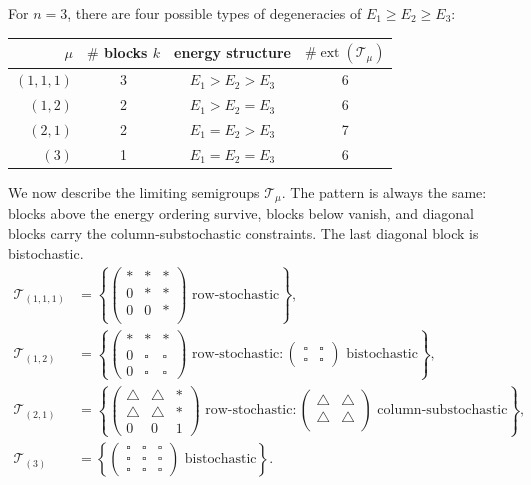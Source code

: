 \documentclass[11pt,a4paper,longbibliography]{amsart}
\numberwithin{equation}{section}
\theoremstyle{plain}
\newtheorem{ex}{Example}[section]
\theoremstyle{definition}
\theoremstyle{remark}
\begin{document}
	For $n=3$, there are four possible types of degeneracies of 
	$E_1 \ge E_2 \ge E_3 $:
	\begin{table}[h]
		\centering
		\begin{tabular}{r|c|c|c}
			$\mu$ &  $\#$ blocks $k$ & energy structure & $\#\operatorname{ext}(\mathcal{T}_{\mu})$ \\
			\hline
			$(1,1,1)$ & 3 & $E_1>E_2>E_3$ & 6\\
			$(1,2)$ & 2 & $E_1>E_2=E_3$& 6\\
			$(2,1)$ & 2 & $E_1=E_2>E_3$& 7\\
			$(3)$ & 1 & $E_1=E_2=E_3$ & 6 
		\end{tabular}
	\end{table}
	
	
	We now describe the limiting semigroups $\mathcal T_\mu$.
	The pattern is always the same: blocks above the energy ordering survive, blocks below vanish, and diagonal blocks carry the column-substochastic constraints. The last diagonal block is bistochastic.
	\begin{align}
		\mathcal T_{(1,1,1)}&=
		\left\{
		\begin{pmatrix}
			* & * & *\\
			0 & * & * \\
			0 & 0 & * \\
		\end{pmatrix}
		\text{ row-stochastic}
		\right\},\\
		\mathcal T_{(1,2)}&=
		\left\{
		\begin{pmatrix}
			* & * & * \\
			0 & \square & \square\\
			0 & \square & \square
		\end{pmatrix}
		\text{ row-stochastic}
		\colon
		\begin{pmatrix}
			\square  & \square \\
			\square  & \square 
		\end{pmatrix}
		\text{ bistochastic}
		\right\},\nonumber\\
		\mathcal T_{(2,1)}&=
		\left\{
		\begin{pmatrix}
			\triangle & \triangle  & *\\
			\triangle & \triangle & *\\
			0 & 0 & 1
		\end{pmatrix}
		\text{ row-stochastic}
		\colon
		\begin{pmatrix}
			\triangle & \triangle \\
			\triangle & \triangle \\
		\end{pmatrix}
		\text{ column-substochastic}
		\right\},\nonumber\\
		\mathcal T_{(3)}&=\left\{
		\begin{pmatrix}
			\square & \square  & \square\\
			\square & \square & \square\\
			\square & \square & \square
		\end{pmatrix} \text{ 
			bistochastic}\right\}.\nonumber
	\end{align}
	
\end{document}
